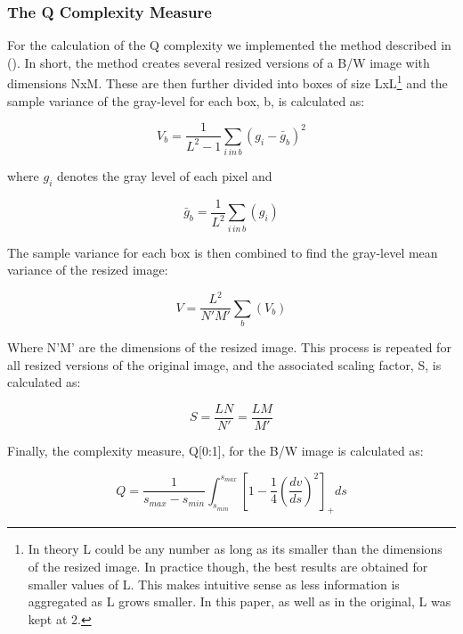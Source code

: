 \documentclass[12pt]{article}
\begin{document}
\subsubsection{The Q Complexity Measure}\label{Q}
For the calculation of the Q complexity we implemented the method described in (\cite{zanetteQuantifyingComplexityBlackandwhite2018}). In short, the method creates several resized versions of a B/W image with dimensions NxM. These are then further divided into boxes of size LxL\footnote{In theory L could be any number as long as its smaller than the dimensions of the resized image. In practice though, the best results are obtained for smaller values of L. This makes intuitive sense as less information is aggregated as L grows smaller. In this paper, as well as in the original, L was kept at 2.} and the sample variance of the gray-level for each box, b, is calculated as: 

\begin{equation}
	V_b = \frac{1}{L^2-1}\sum_{i\,in\,b}(g_i-\bar{g}_b)^2
	\label{eq:Q1}
\end{equation} 

where $g_i$ denotes the gray level of each pixel and

\begin{equation}
	\bar{g}_b = \frac{1}{L^2}\sum_{i\,in\,b}(g_i)
	\label{eq:Q2}
\end{equation} 

The sample variance for each box is then combined to find the gray-level mean variance of the resized image:

\begin{equation}
	V = \frac{L^2}{N'M'}\sum_{b}(V_b)
	\label{eq:Q3}
\end{equation} 

Where N'M' are the dimensions of the resized image. This process is repeated for all resized versions of the original image, and the associated scaling factor, S, is calculated as:

\begin{equation}
	S = \frac{LN}{N'} = \frac{LM}{M'}
	\label{eq:Q4}
\end{equation} 

Finally, the complexity measure, Q[0:1], for the B/W image is calculated as: 

\begin{equation}
	Q = \frac{1}{s_{max}-s_{min}}\int_{s_{min}}^{s_{max}} \left[1-\frac{1}{4} \left(\frac{dv}{ds}\right)^2 \right]_+ds
	\label{eq:Q5}
\end{equation} 
\end{document}
